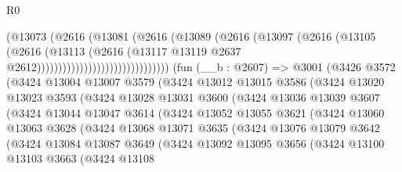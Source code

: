 \begin{lexlean}{R0}
\begin{coremodule}
                                        (@13073
                                          (@2616
                                            (@13081
                                              (@2616
                                                (@13089
                                                  (@2616
                                                    (@13097
                                                      (@2616
                                                        (@13105
                                                          (@2616
                                                            (@13113
                                                              (@2616
                                                                (@13117
                                                                  @13119
                                                                  @2637
                                                                  @2612)))))))))))))))))))))))))))))))
    (fun (__b : @2607) =>
    @3001
      (@3426
        @3572
        (@3424
          @13004
          @13007
          @3579
          (@3424
            @13012
            @13015
            @3586
            (@3424
              @13020
              @13023
              @3593
              (@3424
                @13028
                @13031
                @3600
                (@3424
                  @13036
                  @13039
                  @3607
                  (@3424
                    @13044
                    @13047
                    @3614
                    (@3424
                      @13052
                      @13055
                      @3621
                      (@3424
                        @13060
                        @13063
                        @3628
                        (@3424
                          @13068
                          @13071
                          @3635
                          (@3424
                            @13076
                            @13079
                            @3642
                            (@3424
                              @13084
                              @13087
                              @3649
                              (@3424
                                @13092
                                @13095
                                @3656
                                (@3424
                                  @13100
                                  @13103
                                  @3663
                                  (@3424
                                    @13108

\end{coremodule}
\end{lexlean}
